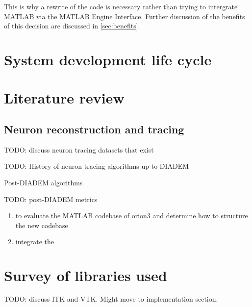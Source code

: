This is why a rewrite of the code is necessary rather than trying
to intergrate MATLAB via the MATLAB Engine Interface. Further
discussion of the benefits of this decision are discussed in \cref{sec:benefits}.

\section{System development life cycle}\label{sec:sdlc}



\section{Literature review}

\subsection{Neuron reconstruction and tracing}\label{subsec:neuron-tracing}

TODO: discuss neuron tracing datasets that exist
~\autocite{Duke-Southampton-archive:Cannon:1998,DIADEM-dataset:Brown:2011}

TODO: History of neuron-tracing algorithms up to DIADEM
~\autocite{DIADEM&Beyond:Liu:2011,NeuroMorphTrends:Halavi:2012,NeuroTracePerspect:Meijering:2010}

Post-DIADEM algorithms
~\autocite{Bauer2010,MIA-anisotropic-path-searching-Xie2011,MICCAI-anisotropic-path-searching-Xie2010,
Jeong2015,Luo2015,De2015,Gulyanon2015,ORION_Santamaria-Pang2015,Mukherjee2014,Hernandez-Herrera2014,Basu2014,Xiao2013,Jimenez2013,Basu2013,Mukherjee2013,Hernandez-Herrera2013,Ming2013,Lee2012,Czarnecki2012}

TODO: post-DIADEM metrics~\autocite{Mayerich2011,Mayerich2012,btmorph-Torben-Nielsen2014,Costa2014,Gillette2015}

\begin{enumerate}[label=(\roman*)]
\item to evaluate the MATLAB codebase of \gls{orion3} and determine how to structure the new codebase
\item integrate the
\end{enumerate}

%

\section{Survey of libraries used}

TODO: discuss ITK and VTK. Might move to implementation section.


